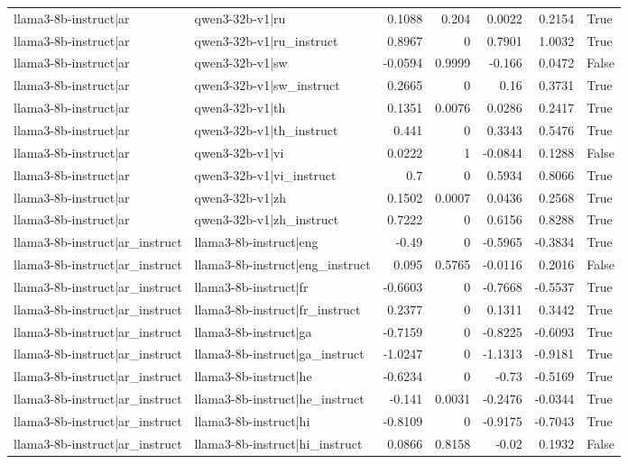 \begin{table}
\begin{tabular}{l l r r r r l}
llama3-8b-instruct|ar & qwen3-32b-v1|ru & 0.1088 & 0.204 & 0.0022 & 0.2154 & True \\
llama3-8b-instruct|ar & qwen3-32b-v1|ru_instruct & 0.8967 & 0 & 0.7901 & 1.0032 & True \\
llama3-8b-instruct|ar & qwen3-32b-v1|sw & -0.0594 & 0.9999 & -0.166 & 0.0472 & False \\
llama3-8b-instruct|ar & qwen3-32b-v1|sw_instruct & 0.2665 & 0 & 0.16 & 0.3731 & True \\
llama3-8b-instruct|ar & qwen3-32b-v1|th & 0.1351 & 0.0076 & 0.0286 & 0.2417 & True \\
llama3-8b-instruct|ar & qwen3-32b-v1|th_instruct & 0.441 & 0 & 0.3343 & 0.5476 & True \\
llama3-8b-instruct|ar & qwen3-32b-v1|vi & 0.0222 & 1 & -0.0844 & 0.1288 & False \\
llama3-8b-instruct|ar & qwen3-32b-v1|vi_instruct & 0.7 & 0 & 0.5934 & 0.8066 & True \\
llama3-8b-instruct|ar & qwen3-32b-v1|zh & 0.1502 & 0.0007 & 0.0436 & 0.2568 & True \\
llama3-8b-instruct|ar & qwen3-32b-v1|zh_instruct & 0.7222 & 0 & 0.6156 & 0.8288 & True \\
llama3-8b-instruct|ar_instruct & llama3-8b-instruct|eng & -0.49 & 0 & -0.5965 & -0.3834 & True \\
llama3-8b-instruct|ar_instruct & llama3-8b-instruct|eng_instruct & 0.095 & 0.5765 & -0.0116 & 0.2016 & False \\
llama3-8b-instruct|ar_instruct & llama3-8b-instruct|fr & -0.6603 & 0 & -0.7668 & -0.5537 & True \\
llama3-8b-instruct|ar_instruct & llama3-8b-instruct|fr_instruct & 0.2377 & 0 & 0.1311 & 0.3442 & True \\
llama3-8b-instruct|ar_instruct & llama3-8b-instruct|ga & -0.7159 & 0 & -0.8225 & -0.6093 & True \\
llama3-8b-instruct|ar_instruct & llama3-8b-instruct|ga_instruct & -1.0247 & 0 & -1.1313 & -0.9181 & True \\
llama3-8b-instruct|ar_instruct & llama3-8b-instruct|he & -0.6234 & 0 & -0.73 & -0.5169 & True \\
llama3-8b-instruct|ar_instruct & llama3-8b-instruct|he_instruct & -0.141 & 0.0031 & -0.2476 & -0.0344 & True \\
llama3-8b-instruct|ar_instruct & llama3-8b-instruct|hi & -0.8109 & 0 & -0.9175 & -0.7043 & True \\
llama3-8b-instruct|ar_instruct & llama3-8b-instruct|hi_instruct & 0.0866 & 0.8158 & -0.02 & 0.1932 & False \\

\end{tabular}
\end{table}
